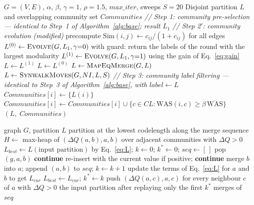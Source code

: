 \documentclass[conference]{IEEEtran}
\newcommand{\algcomment}[1]{\Statex \textit{// #1}}
\begin{document}
\begin{algorithm*}[t]
\footnotesize
\caption{Proposed pipeline (M1--M6)}\label{alg:ours}
\begin{algorithmic}[1]
\Require $G=(V,E)$, $\alpha$, $\beta$, $\gamma{=}1$, $\rho{=}1.5$, $max\_iter$, sweeps $S{=}20$
\Ensure Disjoint partition $L$ and overlapping community set $Communities$
\algcomment{Step 1: community pre-selection --- identical to Step~1 of Algorithm~\ref{alg:base}; result $L_1$}
\algcomment{Step 2$'$: community evolution (modified)}
\State precompute $\mathrm{Sim}(i,j)\gets c_{ij}/(1+c_{ij})$ for all edges 
\State $L^{(0)}\gets\textsc{Evolve}(G,L_1,\gamma{=}0)$ with guard: return the labels of the round with the largest modularity 
\State $L^{(1)}\gets\textsc{Evolve}(G,L_1,\gamma{=}1)$ using the gain of Eq.~\eqref{eq:gain} 
 
  \State $L\gets L^{(1)}$
\Else
  \State $L\gets L^{(0)}$
\EndIf
\State $L\gets\textsc{MapEqMerge}(G,L)$ 
\State $L\gets\textsc{SynwalkMoves}(G,NI,L,S)$ 
\algcomment{Step 3: community label filtering --- identical to Step~3 of Algorithm~\ref{alg:base}, with $label\gets L$}
 $Communities[i]\gets\{L(i)\}$ \EndFor
{}
  \State $Communities[i]\gets Communities[i]\cup\{c\in CL:\mathrm{WAS}(i,c)\ge\beta\,\overline{\mathrm{WAS}}\}$ 
\EndFor
\State \Return $(L,\;Communities)$
\end{algorithmic}
\end{algorithm*}

\begin{algorithm}[t]
\footnotesize
\caption{\textsc{MapEqMerge}$(G,L)$ (M5)}\label{alg:merge}
\begin{algorithmic}[1]
\Require graph $G$, partition $L$
\Ensure partition at the lowest codelength along the merge sequence
\State $H\gets$ max-heap of $(\Delta Q(a,b),a,b)$ over adjacent communities with $\Delta Q>0$
\State $L_{best}\gets L(\text{input partition})$ by Eq.~\eqref{eq:L}; $k\gets0$; $k^{*}\gets0$; $seq\gets[\,]$
  \State pop $(g,a,b)$
   \textbf{continue} \EndIf
   re-insert with the current value if positive; \textbf{continue} \EndIf
  \State merge $b$ into $a$; append $(a,b)$ to $seq$; $k\gets k+1$
  \State update the terms of Eq.~\eqref{eq:L} for $a$ and $b$ to get $L_{cur}$
   $L_{best}\gets L_{cur}$; $k^{*}\gets k$ \EndIf
  \State push $(\Delta Q(a,c),a,c)$ for every neighbour $c$ of $a$ with $\Delta Q>0$
\EndWhile
\State \Return the input partition after replaying only the first $k^{*}$ merges of $seq$
\end{algorithmic}
\end{algorithm}
\end{document}
